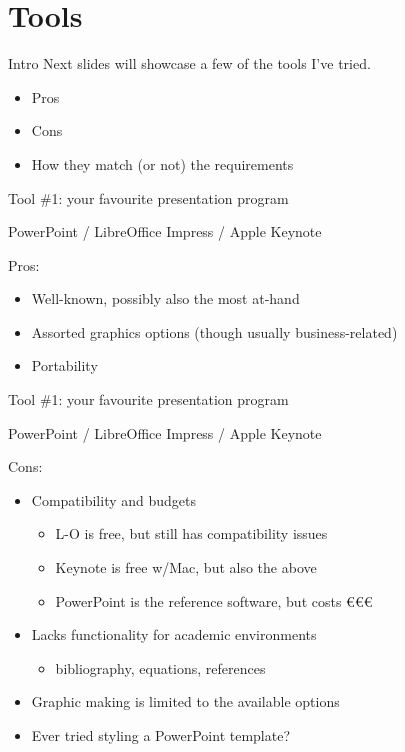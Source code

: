 \documentclass[aspectratio=169]{divoc}
\begin{document}
\section{Tools}
\begin{frame}{Intro}
  Next slides will showcase a few of the tools I've tried.

  \begin{itemize}
    \item Pros
    \item Cons
    \item How they match (or not) the requirements
  \end{itemize}
\end{frame}
\begin{frame}{Tool \#1: your favourite presentation program}
  \begin{center}
    PowerPoint / LibreOffice Impress / Apple Keynote
  \end{center}

  Pros:
  \begin{itemize}
    \item Well-known, possibly also the most at-hand
    \item Assorted graphics options (though usually business-related)
    \item Portability
  \end{itemize}
\end{frame}
\begin{frame}{Tool \#1: your favourite presentation program}
  \begin{center}
    PowerPoint / LibreOffice Impress / Apple Keynote
  \end{center}

  Cons:
  \begin{itemize}
    \item Compatibility and budgets
          \begin{itemize}
            \item L-O is free, but still has compatibility issues
            \item Keynote is free w/Mac, but also the above
            \item PowerPoint is the reference software, but costs \euro\euro\euro
          \end{itemize}
    \item Lacks functionality for academic environments
          \begin{itemize}
            \item bibliography, equations, references
          \end{itemize}
    \item Graphic making is limited to the available options
    \item Ever tried styling a PowerPoint template?
  \end{itemize}
\end{frame}
\end{document}
